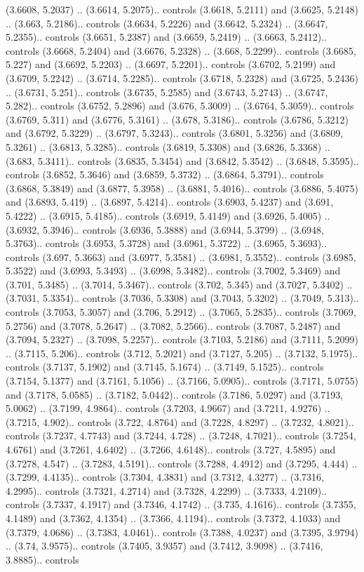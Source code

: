 (3.6608, 5.2037) .. (3.6614, 5.2075).. controls (3.6618, 5.2111) and (3.6625, 5.2148) .. (3.663, 5.2186).. controls (3.6634, 5.2226) and (3.6642, 5.2324) .. (3.6647, 5.2355).. controls (3.6651, 5.2387) and (3.6659, 5.2419) .. (3.6663, 5.2412).. controls (3.6668, 5.2404) and (3.6676, 5.2328) .. (3.668, 5.2299).. controls (3.6685, 5.227) and (3.6692, 5.2203) .. (3.6697, 5.2201).. controls (3.6702, 5.2199) and (3.6709, 5.2242) .. (3.6714, 5.2285).. controls (3.6718, 5.2328) and (3.6725, 5.2436) .. (3.6731, 5.251).. controls (3.6735, 5.2585) and (3.6743, 5.2743) .. (3.6747, 5.282).. controls (3.6752, 5.2896) and (3.676, 5.3009) .. (3.6764, 5.3059).. controls (3.6769, 5.311) and (3.6776, 5.3161) .. (3.678, 5.3186).. controls (3.6786, 5.3212) and (3.6792, 5.3229) .. (3.6797, 5.3243).. controls (3.6801, 5.3256) and (3.6809, 5.3261) .. (3.6813, 5.3285).. controls (3.6819, 5.3308) and (3.6826, 5.3368) .. (3.683, 5.3411).. controls (3.6835, 5.3454) and (3.6842, 5.3542) .. (3.6848, 5.3595).. controls (3.6852, 5.3646) and (3.6859, 5.3732) .. (3.6864, 5.3791).. controls (3.6868, 5.3849) and (3.6877, 5.3958) .. (3.6881, 5.4016).. controls (3.6886, 5.4075) and (3.6893, 5.419) .. (3.6897, 5.4214).. controls (3.6903, 5.4237) and (3.691, 5.4222) .. (3.6915, 5.4185).. controls (3.6919, 5.4149) and (3.6926, 5.4005) .. (3.6932, 5.3946).. controls (3.6936, 5.3888) and (3.6944, 5.3799) .. (3.6948, 5.3763).. controls (3.6953, 5.3728) and (3.6961, 5.3722) .. (3.6965, 5.3693).. controls (3.697, 5.3663) and (3.6977, 5.3581) .. (3.6981, 5.3552).. controls (3.6985, 5.3522) and (3.6993, 5.3493) .. (3.6998, 5.3482).. controls (3.7002, 5.3469) and (3.701, 5.3485) .. (3.7014, 5.3467).. controls (3.702, 5.345) and (3.7027, 5.3402) .. (3.7031, 5.3354).. controls (3.7036, 5.3308) and (3.7043, 5.3202) .. (3.7049, 5.313).. controls (3.7053, 5.3057) and (3.706, 5.2912) .. (3.7065, 5.2835).. controls (3.7069, 5.2756) and (3.7078, 5.2647) .. (3.7082, 5.2566).. controls (3.7087, 5.2487) and (3.7094, 5.2327) .. (3.7098, 5.2257).. controls (3.7103, 5.2186) and (3.7111, 5.2099) .. (3.7115, 5.206).. controls (3.712, 5.2021) and (3.7127, 5.205) .. (3.7132, 5.1975).. controls (3.7137, 5.1902) and (3.7145, 5.1674) .. (3.7149, 5.1525).. controls (3.7154, 5.1377) and (3.7161, 5.1056) .. (3.7166, 5.0905).. controls (3.7171, 5.0755) and (3.7178, 5.0585) .. (3.7182, 5.0442).. controls (3.7186, 5.0297) and (3.7193, 5.0062) .. (3.7199, 4.9864).. controls (3.7203, 4.9667) and (3.7211, 4.9276) .. (3.7215, 4.902).. controls (3.722, 4.8764) and (3.7228, 4.8297) .. (3.7232, 4.8021).. controls (3.7237, 4.7743) and (3.7244, 4.728) .. (3.7248, 4.7021).. controls (3.7254, 4.6761) and (3.7261, 4.6402) .. (3.7266, 4.6148).. controls (3.727, 4.5895) and (3.7278, 4.547) .. (3.7283, 4.5191).. controls (3.7288, 4.4912) and (3.7295, 4.444) .. (3.7299, 4.4135).. controls (3.7304, 4.3831) and (3.7312, 4.3277) .. (3.7316, 4.2995).. controls (3.7321, 4.2714) and (3.7328, 4.2299) .. (3.7333, 4.2109).. controls (3.7337, 4.1917) and (3.7346, 4.1742) .. (3.735, 4.1616).. controls (3.7355, 4.1489) and (3.7362, 4.1354) .. (3.7366, 4.1194).. controls (3.7372, 4.1033) and (3.7379, 4.0686) .. (3.7383, 4.0461).. controls (3.7388, 4.0237) and (3.7395, 3.9794) .. (3.74, 3.9575).. controls (3.7405, 3.9357) and (3.7412, 3.9098) .. (3.7416, 3.8885).. controls 